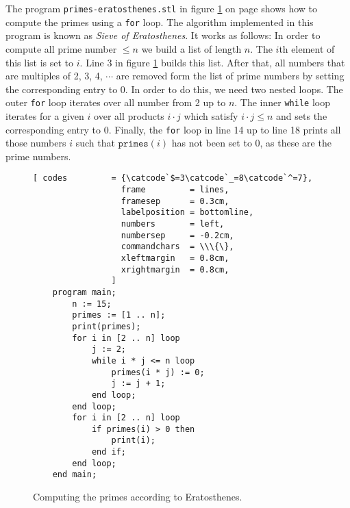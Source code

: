 The program \texttt{primes-eratosthenes.stl} in figure  \ref{fig:primes-eratosthenes.stl} on page
\pageref{fig:primes-eratosthenes.stl} shows how to compute the primes using a  \texttt{for} loop.
The algorithm implemented in this program is known as
 \emph{Sieve of Eratosthenes}.  
It works as follows:  In order to compute all prime number $\leq n$ we build a list of 
length  $n$. The $i$th element of this list is set to $i$.
Line 3 in figure  \ref{fig:primes-eratosthenes.stl} builds this list.
After that, all numbers that are multiples of  2, 3, 4, $\cdots$ are removed form the list
of prime numbers by setting the corresponding entry to $0$.
In order to do this, we need two nested loops.
The outer \texttt{for} loop iterates over all number from  2 up to  $n$.  
The inner  \texttt{while} loop iterates for a given $i$ over all products $i \cdot j$
which satisfy $i \cdot j \leq n$ and sets the corresponding entry to $0$.
Finally, the \texttt{for} loop in line 14 up to line 18 prints all those 
numbers $i$ such that $\mathtt{primes}(i)$  has not been set to 0, as these are the prime numbers.

\begin{figure}[!ht]
  \centering
\begin{Verbatim}[ codes         = {\catcode`$=3\catcode`_=8\catcode`^=7},
                  frame         = lines, 
                  framesep      = 0.3cm, 
                  labelposition = bottomline,
                  numbers       = left,
                  numbersep     = -0.2cm,
                  commandchars  = \\\{\},
                  xleftmargin   = 0.8cm,
                  xrightmargin  = 0.8cm,
                ]
    program main;
        n := 15;
        primes := [1 .. n];
        print(primes);
        for i in [2 .. n] loop
            j := 2;
            while i * j <= n loop
                primes(i * j) := 0;
                j := j + 1;
            end loop;
        end loop;
        for i in [2 .. n] loop
            if primes(i) > 0 then
                print(i);
            end if;
        end loop;
    end main;
\end{Verbatim} 
\vspace*{-0.3cm}
\caption{Computing the primes according to  Eratosthenes.}  \label{fig:primes-eratosthenes.stl}
\end{figure} %

